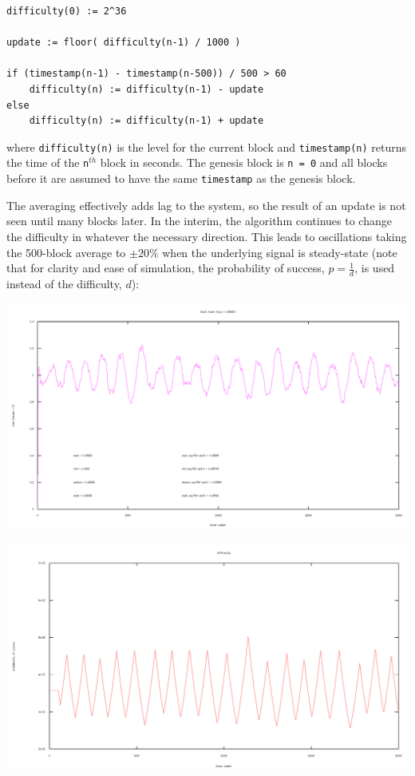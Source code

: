 \documentclass[10pt,a4paper]{article}
\begin{document}
\begin{verbatim}
difficulty(0) := 2^36 

update := floor( difficulty(n-1) / 1000 )

if (timestamp(n-1) - timestamp(n-500)) / 500 > 60
    difficulty(n) := difficulty(n-1) - update
else
    difficulty(n) := difficulty(n-1) + update
\end{verbatim}
where {\tt difficulty(n)} is the level for the current block and {\tt timestamp(n)} returns the time of the {\tt n}$^{th}$ block in seconds. The genesis block is {\tt n = 0} and all blocks before it are assumed to have the same {\tt timestamp} as the genesis block.

The averaging effectively adds lag to the system, so the result of an update is not seen until many blocks later. In the interim, the algorithm continues to change the difficulty in whatever the necessary direction. This leads to oscillations taking the 500-block average to $\pm 20\%$ when the underlying signal is steady-state (note that for clarity and ease of simulation, the probability of success, $p = \frac{1}{d}$, is used instead of the difficulty, $d$):

\includegraphics[width=14cm]{SimulationGraphs/simulation_avg-500_upd-1_.png}

\includegraphics[width=14cm]{SimulationGraphs/simulation_avg-500_upd-1_diff.png}
\end{document}
